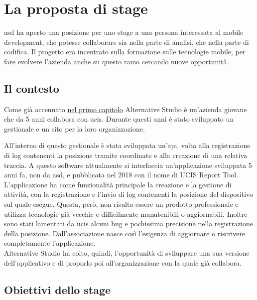 
\section{La proposta di stage}

\acrlong{asd} ha aperto una posizione per uno stage a una persona interessata al mobile development, che potesse collaborare sia nella parte di analisi, che nella parte di codifica. Il progetto era incentrato sulla formazione sulle tecnologie mobile, per fare evolvere l'azienda anche su questo ramo cercando nuove opportunità.

\subsection{Il contesto}

Come già accennato {\hyperref[cap:introduzione]{nel primo capitolo}} Alternative Studio è un'azienda giovane che da 5 anni collabora con
\gls{ucis}. Durante questi anni è stato sviluppato un gestionale e un sito per la loro organizzazione.


All'interno di questo gestionale è stata sviluppata un'\acrshort{api}, volta alla registrazione di log contenenti la posizione tramite
coordinate e alla creazione di una relativa traccia. A questo software attualmente si interfaccia un'applicazione sviluppata 5 anni fa, non
da \acrlong{asd}, e pubblicata nel 2018 con il nome di UCIS Report Tool. L'applicazione ha come funzionalità principale la creazione e la
gestione di attività, con la registrazione e l'invio di log contenenti la posizione del dispositivo sul quale esegue. Questa, però, non
risulta essere un prodotto professionale e utilizza tecnologie già vecchie e difficilmente manutenibili o aggiornabili. Inoltre sono stati
lamentati da \gls{ucis} alcuni bug e pochissima precisione nella registrazione della posizione. Dall'associazione nasce così l'esigenza di aggiornare
o riscrivere completamente l'applicazione. \\
\noindent Alternative Studio ha colto, quindi, l'opportunità di sviluppare una sua versione dell'applicativo e di proporlo poi all'organizzazione con la quale già collabora.

\subsection{Obiettivi dello stage}
\label{sec:obiettivi}

